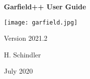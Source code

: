 \begin{titlepage}
  {
  \centering
  \sffamily
  \linespread{1.5}

  \vspace{3cm} 

  \huge{\textbf{Garfield++ User Guide}}

  \vspace{2cm}

  \texttt{[image: garfield.jpg]}

  \vspace{2cm}

  \large
  Version 2021.2

  \vspace{2cm}
  \large
  H. Schindler

  \vfill

  July 2020

  }
\end{titlepage}
